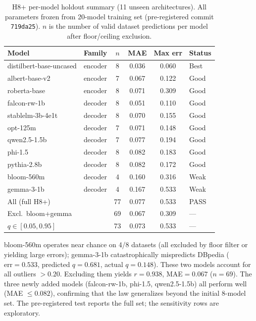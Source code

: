 \documentclass{article}
\begin{document}
\begin{table}[h]
\centering
\caption{H8+ per-model holdout summary (11 unseen architectures). All parameters frozen from 20-model training set (pre-registered commit \texttt{719da25}). $n$ is the number of valid dataset predictions per model after floor/ceiling exclusion.}
\label{tab:h8plus-detail}
\small
\begin{tabular}{llcccl}
\toprule
Model & Family & $n$ & MAE & Max err & Status \\
\midrule
distilbert-base-uncased & encoder & 8 & 0.036 & 0.060 & Best \\
albert-base-v2 & encoder & 7 & 0.067 & 0.122 & Good \\
roberta-base & encoder & 8 & 0.071 & 0.309 & Good \\
falcon-rw-1b & decoder & 8 & 0.051 & 0.110 & Good \\
stablelm-3b-4e1t & decoder & 8 & 0.070 & 0.155 & Good \\
opt-125m & decoder & 7 & 0.071 & 0.148 & Good \\
qwen2.5-1.5b & decoder & 7 & 0.077 & 0.194 & Good \\
phi-1.5 & decoder & 8 & 0.082 & 0.183 & Good \\
pythia-2.8b & decoder & 8 & 0.082 & 0.172 & Good \\
bloom-560m & decoder & 4 & 0.160 & 0.316 & Weak \\
gemma-3-1b & decoder & 4 & 0.167 & 0.533 & Weak \\
\midrule
\multicolumn{2}{l}{All (full H8+)} & 77 & 0.077 & 0.533 & PASS \\
\multicolumn{2}{l}{Excl.\ bloom+gemma} & 69 & 0.067 & 0.309 & --- \\
\multicolumn{2}{l}{$q\in[0.05,0.95]$} & 73 & 0.073 & 0.533 & --- \\
\bottomrule
\end{tabular}
\end{table}

bloom-560m operates near chance on 4/8 datasets (all excluded by floor filter or yielding large errors);
gemma-3-1b catastrophically mispredicts DBpedia ($\mathrm{err}=0.533$, predicted $q=0.681$, actual $q=0.148$).
These two models account for all outliers $>0.20$. Excluding them yields
$r=0.938$, MAE$=0.067$ ($n=69$). The three newly added models (falcon-rw-1b, phi-1.5, qwen2.5-1.5b) all perform well (MAE $\leq 0.082$), confirming that the law generalizes beyond the initial 8-model set. The pre-registered test reports the full set; the sensitivity rows are exploratory.
\end{document}
